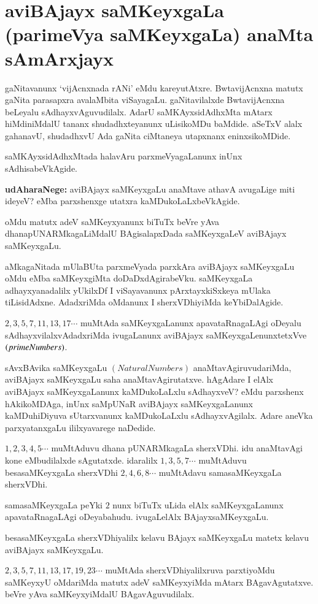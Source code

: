 \chapter{aviBAjayx saMKeyxgaLa (parimeVya saMKeyxgaLa) anaMta sAmArxjayx}


gaNitavanunx `vijAcnxnada rANi' eMdu kareyutAtxre. BwtavijAcnxna matutx gaNita \-parasapxra avalaMbita viSayagaLu. gaNitavilalxde BwtavijAcnxna beLeyalu sAdhayxvAguvudilalx. AdarU saMKAyxsidAdhxMta mAtarx hiMdiniMdalU tananx shudadhxteyanunx uLisikoMDu baMdide. aSeTxV alalx gahanavU, shudadhxvU Ada gaNita ciMtaneya utapxnanx eninxsikoMDide.

saMKAyxsidAdhxMtada halavAru parxmeVyagaLanunx inUnx sAdhisabeVkAgide. 

\textbf{udAharaNege:} aviBAjayx saMKeyxgaLu anaMtave athavA avugaLige miti ideyeV? eMba parxshenxge utatxra kaMDukoLaLxbeVkAgide. 

oMdu matutx adeV saMKeyxyanunx biTuTx beVre yAva dhanapUNARMkagaLiMdalU BAgisalapxDada saMKeyxgaLeV aviBAjayx saMKeyxgaLu.

aMkagaNitada mUlaBUta parxmeVyada parxkAra aviBAjayx saMKeyxgaLu oMdu eMba saMKeyxgiMta doDaDxdAgirabeVku. saMKeyxgaLa adhayxyanadalilx yUkilxDf I viSayavanunx pArxtayxkiSxkeya mUlaka tiLisidAdxne. AdadxriMda oMdanunx I sherxVDhiyiMda keYbiDalAgide.
 
 $2,3,5,7,11,13,17\cdots$ muMtAda saMKeyxgaLanunx apavataRnagaLAgi oDe\break yalu sAdhayxvilalxvAdadxriMda ivugaLanunx aviBAjayx saMKeyxgaLenunxtetxVve $(prime\- Numbers)$.

sAvxBAvika saMKeyxgaLu $(Natural Numbers)$ anaMtavAgiruvudariMda, avi\-BAjayx saMKeyxgaLu saha anaMtavAgirutatxve. hAgAdare I elAlx aviBAjayx saMKeyxgaLanunx kaMDukoLaLxlu sAdhayxveV? eMdu parxshenx hAkikoMDAga, inUnx saMpUNaR aviBAjayx saMKeyxgaLanunx kaMDuhiDiyuva sUtarxvanunx kaMDukoLaLxlu sAdhayxvAgilalx. Adare aneVka parxyatanxgaLu ililxyavarege naDedide.

$1,2,3,4,5\cdots$ muMtAduvu dhana pUNARMkagaLa sherxVDhi. idu anaMtavAgi kone eMbudilalxde sAgutatxde. idaralilx $1,3,5,7\cdots$ muMtAduvu besasaMKeyxgaLa sherxVDhi $2,4,6,8\cdots$ muMtAdavu samasaMKeyxgaLa sherxVDhi.

samasaMKeyxgaLa peYki $2$ nunx biTuTx uLida elAlx saMKeyxgaLanunx apavataRnagaLAgi oDeyabahudu. ivugaLelAlx BAjayxsaMKeyxgaLu.

besasaMKeyxgaLa sherxVDhiyalilx kelavu BAjayx saMKeyxgaLu matetx kelavu aviBAjayx saMKeyx\-gaLu.

$2,3,5,7,11,13,17,19,23\cdots$ muMtAda sherxVDhiyalilxruva parxtiyoMdu saMKeyxyU oMdariMda matutx adeV saMKeyxyiMda mAtarx BAgavAgutatxve. beVre yAva saMKeyxyiMdalU BAgavAguvudilalx.

